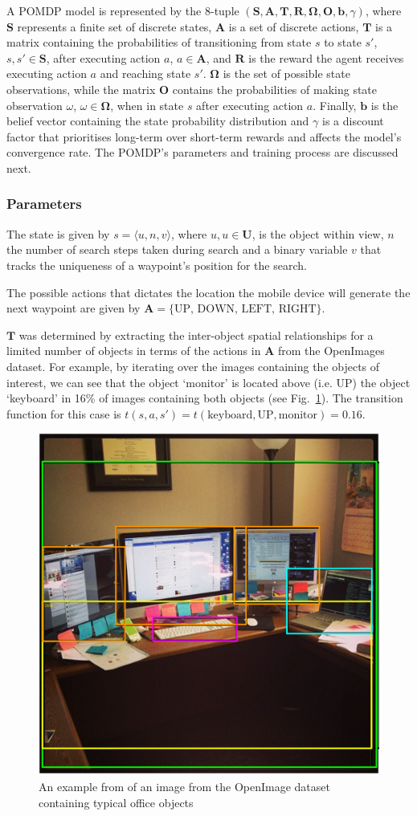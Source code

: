\documentclass[runningheads]{llncs}
\begin{document}
A POMDP model is represented by the 8-tuple $(\mathbf{S}, \mathbf{A}, \mathbf{T}, \mathbf{R}, \mathbf{\Omega}, \mathbf{O}, \mathbf{b}, \gamma)$, where $\mathbf{S}$ represents a finite set of discrete states, $\mathbf{A}$ is a set of discrete actions, $\mathbf{T}$ is a matrix containing the probabilities of transitioning from state $s$ to state $s'$, $s, s' \in \mathbf{S}$, after executing action $a$, $a \in \mathbf{A}$, and $\mathbf{R}$ is the reward the agent receives executing action $a$ and reaching state $s'$.
$\mathbf{\Omega}$ is the set of possible state observations, while the matrix $\mathbf{O}$ contains the probabilities of making state observation $\omega$, $\omega \in \mathbf{\Omega}$, when in state $s$ after executing action $a$.
Finally, $\mathbf{b}$ is the belief vector containing the state probability distribution and $\gamma$ is a discount factor that prioritises long-term over short-term rewards and affects the model's convergence rate. 
The POMDP's parameters and training process are discussed next. 

\subsubsection{Parameters}

The state is given by $s = \langle u, n, v \rangle$, where $u, u\in\mathbf{U}$, is the object within view, $n$ the number of search steps taken during search and a binary variable $v$ that tracks the uniqueness of a waypoint's position for the search.

The possible actions that dictates the location the mobile device will generate the next waypoint are given by $\mathbf{A} = \{ \textrm{UP, DOWN, LEFT, RIGHT} \}$.

$\mathbf{T}$ was determined by extracting the inter-object spatial relationships for a limited number of objects in terms of the actions in $\mathbf{A}$ from the OpenImages~\cite{openimages} dataset. 
For example, by iterating over the images containing the objects of interest, we can see that the object `monitor' is located above (i.e. UP) the object `keyboard' in 16\% of images containing both objects (see Fig.~\ref{fig:openimage}). 
The transition function for this case is $t(s, a, s') = t(\textrm{keyboard}, \textrm{UP}, \textrm{monitor}) = 0.16$.

\begin{figure}
  \centering
  \includegraphics[width=0.4\columnwidth]{figures/desk_example.png}
  \caption{An example from of an image from the OpenImage dataset~\cite{openimages} containing typical office objects}\label{fig:openimage}
\end{figure}
\end{document}

